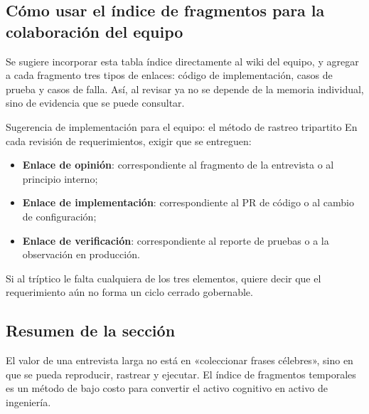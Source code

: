 \subsection{Cómo usar el índice de fragmentos para la colaboración del equipo}

Se sugiere incorporar esta tabla índice directamente al wiki del equipo, y agregar a cada fragmento tres tipos de enlaces: código de implementación, casos de prueba y casos de falla. Así, al revisar ya no se depende de la memoria individual, sino de evidencia que se puede consultar.

\begin{importantbox}{Sugerencia de implementación para el equipo: el método de rastreo tripartito}
En cada revisión de requerimientos, exigir que se entreguen:
\begin{itemize}
    \item \textbf{Enlace de opinión}: correspondiente al fragmento de la entrevista o al principio interno;
    \item \textbf{Enlace de implementación}: correspondiente al PR de código o al cambio de configuración;
    \item \textbf{Enlace de verificación}: correspondiente al reporte de pruebas o a la observación en producción.
\end{itemize}
Si al tríptico le falta cualquiera de los tres elementos, quiere decir que el requerimiento aún no forma un ciclo cerrado gobernable.
\end{importantbox}

\subsection{Resumen de la sección}
El valor de una entrevista larga no está en «coleccionar frases célebres», sino en que se pueda reproducir, rastrear y ejecutar. El índice de fragmentos temporales es un método de bajo costo para convertir el activo cognitivo en activo de ingeniería.

